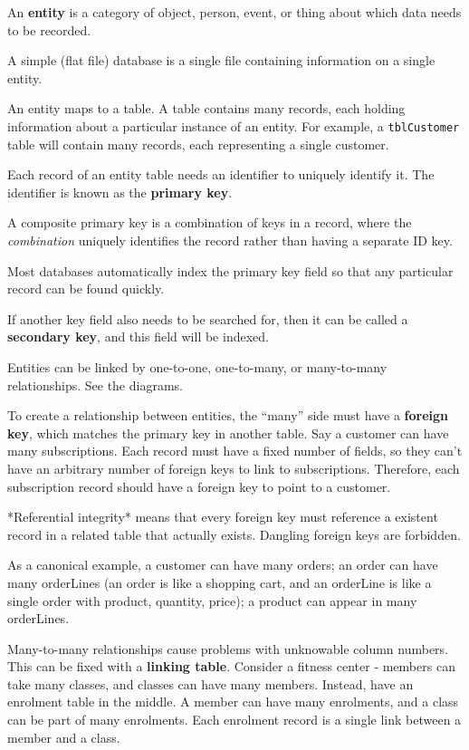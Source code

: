 \documentclass[../main.tex]{subfile}
\begin{document}

An \textbf{entity} is a category of object, person, event, or thing about which data needs to be recorded.

A simple (flat file) database is a single file containing information on a single entity.

An entity maps to a table. A table contains many records, each holding information about a particular instance of an entity. For example, a \texttt{tblCustomer} table will contain many records, each representing a single customer.

Each record of an entity table needs an identifier to uniquely identify it. The identifier is known as the \textbf{primary key}.

A composite primary key is a combination of keys in a record, where the \textit{combination} uniquely identifies the record rather than having a separate ID key.

Most databases automatically index the primary key field so that any particular record can be found quickly.

If another key field also needs to be searched for, then it can be called a \textbf{secondary key}, and this field will be indexed.

Entities can be linked by one-to-one, one-to-many, or many-to-many relationships. See the diagrams.

To create a relationship between entities, the \enquote{many} side must have a \textbf{foreign key}, which matches the primary key in another table. Say a customer can have many subscriptions. Each record must have a fixed number of fields, so they can't have an arbitrary number of foreign keys to link to subscriptions. Therefore, each subscription record should have a foreign key to point to a customer.

*Referential integrity* means that every foreign key must reference a existent record in a related table that actually exists. Dangling foreign keys are forbidden.

As a canonical example, a customer can have many orders; an order can have many orderLines (an order is like a shopping cart, and an orderLine is like a single order with product, quantity, price); a product can appear in many orderLines.

Many-to-many relationships cause problems with unknowable column numbers. This can be fixed with a \textbf{linking table}. Consider a fitness center - members can take many classes, and classes can have many members. Instead, have an enrolment table in the middle. A member can have many enrolments, and a class can be part of many enrolments. Each enrolment record is a single link between a member and a class.
\end{document}
